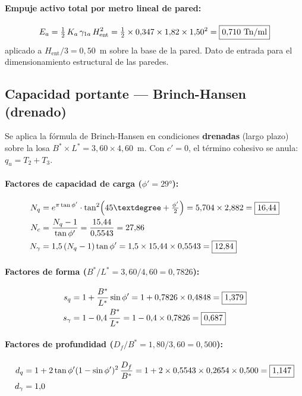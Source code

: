 \paragraph{Empuje activo total por metro lineal de pared:}
\[
  E_a = \tfrac{1}{2}\,K_a\,\gamma_{1a}\,H_\text{ent}^2
      = \tfrac{1}{2}\times0{,}347\times1{,}82\times1{,}50^2
      = \boxed{0{,}710~\text{Tn/ml}}
\]
aplicado a $H_\text{ent}/3=0{,}50$~m sobre la base de la pared.
Dato de entrada para el dimensionamiento estructural de las paredes.

\subsection{Capacidad portante --- Brinch-Hansen (drenado)}
\label{subsec:cap_portante_arqueta}

Se aplica la fórmula de Brinch-Hansen en condiciones \textbf{drenadas}
(largo plazo) sobre la losa $B^*\times L^*=3{,}60\times4{,}60$~m.
Con $c'=0$, el término cohesivo se anula: $q_u = T_2 + T_3$.

\paragraph{Factores de capacidad de carga ($\phi'=29°$):}
\begin{align*}
  N_q &= e^{\pi\tan\phi'}\cdot\tan^2\!\left(45°+\tfrac{\phi'}{2}\right)
       = 5{,}704\times2{,}882 = \resultado{16{,}44}\\
  N_c &= \frac{N_q-1}{\tan\phi'} = \frac{15{,}44}{0{,}5543} = 27{,}86\\
  N_\gamma &= 1{,}5\,(N_q-1)\tan\phi' = 1{,}5\times15{,}44\times0{,}5543
           = \resultado{12{,}84}
\end{align*}

\paragraph{Factores de forma ($B^*/L^*=3{,}60/4{,}60=0{,}7826$):}
\begin{align*}
  s_q      &= 1+\frac{B^*}{L^*}\sin\phi'
            = 1+0{,}7826\times0{,}4848 = \boxed{1{,}379}\\
  s_\gamma &= 1-0{,}4\,\frac{B^*}{L^*}
            = 1-0{,}4\times0{,}7826 = \boxed{0{,}687}
\end{align*}

\paragraph{Factores de profundidad ($D_f/B^*=1{,}80/3{,}60=0{,}500$):}
\begin{align*}
  d_q      &= 1+2\tan\phi'(1-\sin\phi')^2\,\frac{D_f}{B^*}
            = 1+2\times0{,}5543\times0{,}2654\times0{,}500
            = \boxed{1{,}147}\\
  d_\gamma &= 1{,}0
\end{align*}

